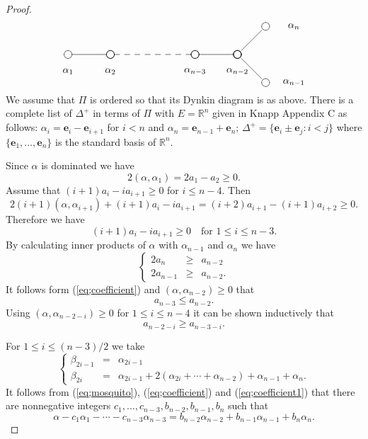 \documentclass[12pt]{amsart}
\theoremstyle{definition}
\theoremstyle{remark}
\numberwithin{equation}{section}
\begin{document}
\begin{proof}
 
\[ 
\xy 
(0,0)*{\cir<4pt>{}}; (15,0)*{\cir<4pt>{}}; **\dir{-};
(15,0)*{\cir<4pt>{}}; (45,0)*{\cir<4pt>{}}; **\dir{--};
(45,0)*{\cir<4pt>{}}; (60,0)*{\cir<4pt>{}}; **\dir{-};
(70,10)*{\cir<4pt>{}}; (60,0)*{\cir<4pt>{}}; **\dir{-};
(70,-10)*{\cir<4pt>{}}; (60,0)*{\cir<4pt>{}}; **\dir{-};
(0,-6)*{\alpha_1};
(15, -6)*{\alpha_{2}};
(45, -6)*{\alpha_{n-3}};
(60, -6)*{\alpha_{n-2}};
(80, -10)*{\alpha_{n-1}};
(80, 10)*{\alpha_n};
\endxy 
\]
We  assume that $\Pi$ is ordered so that its Dynkin diagram is as above. 
There is 
a complete list of $\Delta^+ $ in terms of $\Pi$ with $E=\mathbb R^n$  given in 
Knapp  \cite{knapp} Appendix C
as follows:
$\alpha_i=\mathbf e_i- \mathbf e_{i+1}$ for $i<n$ and $\alpha_n=\mathbf e_{n-1}+\mathbf e_n$; 
$\Delta^+=\{ \mathbf  e_i\pm \mathbf  e_j: i<j\}$ where $\{\mathbf e_1, \ldots, \mathbf  e_n \}$ is
the standard basis of $\mathbb R^n$.

Since $\alpha $ is dominated we have 
 \[
2(\alpha, \alpha_1)=2a_{1}-a_{2}\ge 0.
\]
Assume that $(i+1)a_i-ia_{i+1}\ge 0$ for $i\le n-4$. Then
\[
2(i+1)(\alpha, \alpha_{i+1})+(i+1)a_i-ia_{i+1}=(i+2)a_{i+1}-(i+1)a_{i+2}\ge 0.
\]
Therefore  we have
\begin{equation}\label{eq;mosquito}
(i+1)a_i-ia_{i+1}\ge 0 \quad \mbox{for } 1\le i\le n-3.
\end{equation}
 By calculating  inner products of $\alpha$ with $\alpha_{n-1}$ and $\alpha_n$ we have
 \begin{equation}\label{eq;coefficient}
 \left\{
\begin{array}{lcl}
2a_{n} & \ge & {a_{n-2}} \\
2a_{n-1} & \ge &{a_{n-2}} .
\end{array}
\right.
\end{equation}
It follows form (\ref{eq;coefficient})  and $(\alpha, \alpha_{n-2})\ge 0$ that
\begin{equation*}
a_{n-3}\le a_{n-2}.
\end{equation*}
Using $(\alpha, \alpha_{n-2-i})\ge 0$ for $1\le i\le n-4$ it can be shown inductively that
\begin{equation}\label{eq;coefficient1}
a_{n-2-i}\ge a_{n-3-i}.
\end{equation}

For $1\le i\le  (n-3)/2$  we take 
 \[\left\{
\begin{array}{lcl}
\beta_{2i-1} &=& \alpha_{2i-1}\\
\beta_{2i} &=& \alpha_{2i-1}+2(\alpha_{2i}+\cdots+\alpha_{n-2})+\alpha_{n-1}+\alpha_n.
\end{array}
\right.
\]
It follows from (\ref{eq;mosquito}), (\ref{eq;coefficient}) and (\ref{eq;coefficient1})  that there are nonnegative  integers $c_1, \ldots, c_{n-3}, b_{n-2}, b_{n-1}, b_n$ such that \[
\alpha-c_1\alpha_1-\cdots-c_{n-3}\alpha_{n-3}=b_{n-2}\alpha_{n-2}+b_{n-1}\alpha_{n-1}+b_n\alpha_n.
\]


\end{proof}
\end{document}
